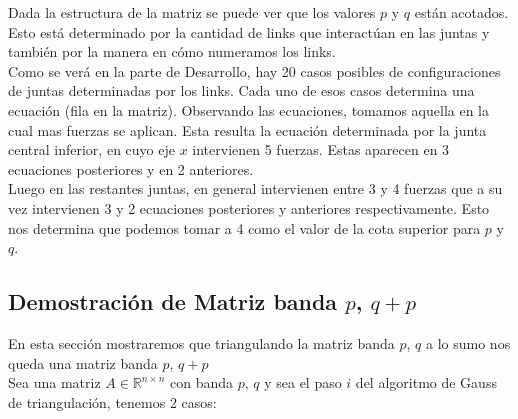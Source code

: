 Dada la estructura de la matriz se puede ver que los valores $p$ y $q$ están acotados. Esto está determinado por la cantidad de links que interactúan en las juntas y también por la manera en cómo numeramos los links.\\

Como se verá en la parte de Desarrollo, hay 20 casos posibles de configuraciones de juntas determinadas por los links. Cada uno de esos casos determina una ecuación (fila en la matriz). Observando las ecuaciones, tomamos aquella en la cual mas fuerzas se aplican. Esta resulta la ecuación determinada por la junta central inferior, en cuyo eje $x$ intervienen 5 fuerzas. Estas aparecen en 3 ecuaciones posteriores y en 2 anteriores.\\

Luego en las restantes juntas, en general intervienen entre 3 y 4 fuerzas que a su vez intervienen 3 y 2 ecuaciones posteriores y anteriores respectivamente. Esto nos determina que podemos tomar a 4 como el valor de la cota superior para $p$ y $q$.

\subsection{Demostración de Matriz banda $p$, $q + p$}

En esta sección mostraremos que triangulando la matriz banda $p$, $q$ a lo sumo nos queda una matriz banda $p$, $q + p$\\

Sea una matriz $A \in \mathbb{R}^{n \times n}$ con banda $p$, $q$ y sea el paso $i$ del algoritmo de Gauss de triangulación, tenemos 2 casos:

